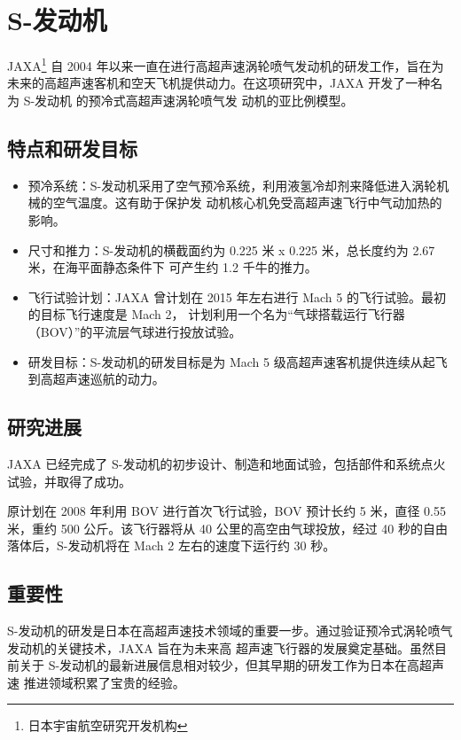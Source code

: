 \documentclass{pkuthesis}
\begin{document}
\section{S-发动机}
JAXA\footnote{日本宇宙航空研究开发机构} 自 2004 年以来一直在进行高超声速涡轮喷气发动机的研发工作，旨在为
未来的高超声速客机和空天飞机提供动力。在这项研究中，JAXA 开发了一种名为 S-发动机 的预冷式高超声速涡轮喷气发
动机的亚比例模型。

\subsection{特点和研发目标}

\begin{itemize}
    \item 预冷系统：S-发动机采用了空气预冷系统，利用液氢冷却剂来降低进入涡轮机械的空气温度。这有助于保护发
    动机核心机免受高超声速飞行中气动加热的影响。
    \item 尺寸和推力：S-发动机的横截面约为 0.225 米 x 0.225 米，总长度约为 2.67 米，在海平面静态条件下
    可产生约 1.2 千牛的推力。
    \item 飞行试验计划：JAXA 曾计划在 2015 年左右进行 Mach 5 的飞行试验。最初的目标飞行速度是 Mach 2，
    计划利用一个名为“气球搭载运行飞行器（BOV）”的平流层气球进行投放试验。
    \item 研发目标：S-发动机的研发目标是为 Mach 5 级高超声速客机提供连续从起飞到高超声速巡航的动力。
\end{itemize}

\subsection{研究进展}

JAXA 已经完成了 S-发动机的初步设计、制造和地面试验，包括部件和系统点火试验，并取得了成功。

原计划在 2008 年利用 BOV 进行首次飞行试验，BOV 预计长约 5 米，直径 0.55 米，重约 500 公斤。该飞行器将从
40 公里的高空由气球投放，经过 40 秒的自由落体后，S-发动机将在 Mach 2 左右的速度下运行约 30 秒。

\subsection{重要性}

S-发动机的研发是日本在高超声速技术领域的重要一步。通过验证预冷式涡轮喷气发动机的关键技术，JAXA 旨在为未来高
超声速飞行器的发展奠定基础。虽然目前关于 S-发动机的最新进展信息相对较少，但其早期的研发工作为日本在高超声速
推进领域积累了宝贵的经验。
\end{document}
